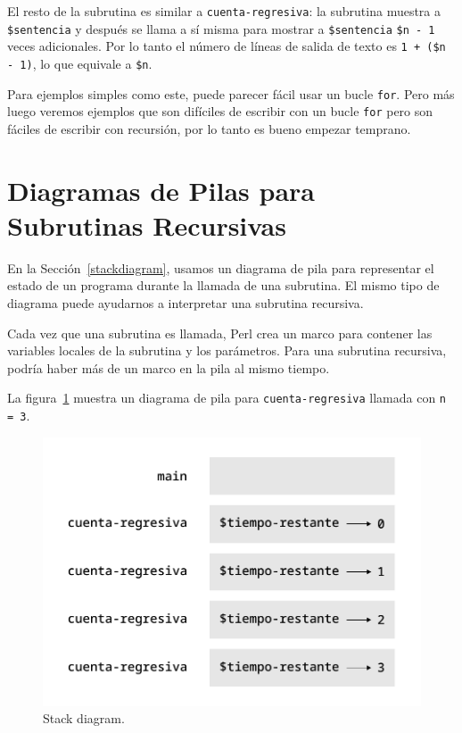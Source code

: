 El resto de la subrutina es similar a {\tt cuenta-regresiva}:
la subrutina muestra a {\tt \$sentencia} y después se llama 
a sí misma para mostrar a {\tt \$sentencia} \verb|$n - 1| veces
adicionales. Por lo tanto el número de líneas de salida de
texto es {\tt 1 + (\$n - 1)}, lo que equivale a {\tt \$n}.

Para ejemplos simples como este, puede parecer fácil usar
un bucle {\tt for}. Pero más luego veremos ejemplos que son
difíciles de escribir con un bucle {\tt for} pero son
fáciles de escribir con recursión, por lo tanto es bueno
empezar temprano.


\section{Diagramas de Pilas para Subrutinas Recursivas}
\label{recursive.stack}

En la Sección~\ref{stackdiagram}, usamos un diagrama de pila 
para representar el estado de un programa durante la llamada de 
una subrutina. El mismo tipo de diagrama puede ayudarnos a interpretar una subrutina recursiva.

Cada vez que una subrutina es llamada, Perl crea un 
marco para contener las variables locales de la subrutina y 
los parámetros. Para una subrutina recursiva, podría haber más
de un marco en la pila al mismo tiempo.

La figura~\ref{fig.stack2} muestra un diagrama de pila para 
{\tt cuenta-regresiva} llamada con {\tt n = 3}.

\begin{figure}
\centerline
{\includegraphics[scale=0.6]{figs/stack2.pdf}}
\caption{Stack diagram.}
\label{fig.stack2}
\end{figure}


